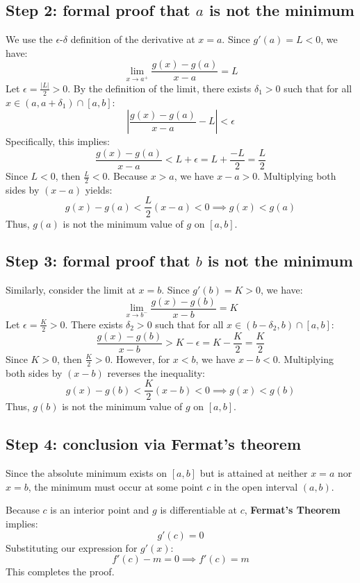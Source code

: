 \begin{notechapter}
\subsection{Step 2: formal proof that $a$ is not the minimum}
We use the $\epsilon$-$\delta$ definition of the derivative at $x=a$. Since $g'(a) = L < 0$, we have:
\[ \lim_{x \to a^+} \frac{g(x) - g(a)}{x - a} = L \]
Let $\epsilon = \frac{|L|}{2} > 0$. By the definition of the limit, there exists $\delta_1 > 0$ such that for all $x \in (a, a + \delta_1) \cap [a, b]$:
\[ \left| \frac{g(x) - g(a)}{x - a} - L \right| < \epsilon \]
Specifically, this implies:
\[ \frac{g(x) - g(a)}{x - a} < L + \epsilon = L + \frac{-L}{2} = \frac{L}{2} \]
Since $L < 0$, then $\frac{L}{2} < 0$. Because $x > a$, we have $x - a > 0$. Multiplying both sides by $(x - a)$ yields:
\[ g(x) - g(a) < \frac{L}{2}(x - a) < 0 \implies g(x) < g(a) \]
Thus, $g(a)$ is not the minimum value of $g$ on $[a, b]$.

\subsection{Step 3: formal proof that $b$ is not the minimum}
Similarly, consider the limit at $x=b$. Since $g'(b) = K > 0$, we have:
\[ \lim_{x \to b^-} \frac{g(x) - g(b)}{x - b} = K \]
Let $\epsilon = \frac{K}{2} > 0$. There exists $\delta_2 > 0$ such that for all $x \in (b - \delta_2, b) \cap [a, b]$:
\[ \frac{g(x) - g(b)}{x - b} > K - \epsilon = K - \frac{K}{2} = \frac{K}{2} \]
Since $K > 0$, then $\frac{K}{2} > 0$. However, for $x < b$, we have $x - b < 0$. Multiplying both sides by $(x - b)$ reverses the inequality:
\[ g(x) - g(b) < \frac{K}{2}(x - b) < 0 \implies g(x) < g(b) \]
Thus, $g(b)$ is not the minimum value of $g$ on $[a, b]$.

\subsection{Step 4: conclusion via Fermat's theorem}
Since the absolute minimum exists on $[a, b]$ but is attained at neither $x=a$ nor $x=b$, the minimum must occur at some point $c$ in the open interval $(a, b)$. 

Because $c$ is an interior point and $g$ is differentiable at $c$, \textbf{Fermat's Theorem} implies:
\[ g'(c) = 0 \]
Substituting our expression for $g'(x)$:
\[ f'(c) - m = 0 \implies f'(c) = m \]
This completes the proof.
\end{notechapter}
